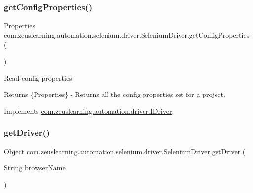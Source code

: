 \hypertarget{classcom_1_1zeuslearning_1_1automation_1_1selenium_1_1driver_1_1SeleniumDriver_afc8bad9a9bea7df6280ba685e52db540}{}\label{classcom_1_1zeuslearning_1_1automation_1_1selenium_1_1driver_1_1SeleniumDriver_afc8bad9a9bea7df6280ba685e52db540} 
\subsubsection{\texorpdfstring{get\+Config\+Properties()}{getConfigProperties()}}
{\footnotesize\ttfamily Properties com.\+zeuslearning.\+automation.\+selenium.\+driver.\+Selenium\+Driver.\+get\+Config\+Properties (\begin{DoxyParamCaption}{ }\end{DoxyParamCaption})\hspace{0.3cm}{\ttfamily [inline]}}

Read config properties

\begin{DoxyReturn}{Returns}
\{Properties\} -\/ Returns all the config properties set for a project. 
\end{DoxyReturn}


Implements \hyperlink{interfacecom_1_1zeuslearning_1_1automation_1_1driver_1_1IDriver_a2530732df342f07743bed12deb55fee8}{com.\+zeuslearning.\+automation.\+driver.\+I\+Driver}.

\hypertarget{classcom_1_1zeuslearning_1_1automation_1_1selenium_1_1driver_1_1SeleniumDriver_a42a9e6ef86ef492717b3fed95e9f353f}{}\label{classcom_1_1zeuslearning_1_1automation_1_1selenium_1_1driver_1_1SeleniumDriver_a42a9e6ef86ef492717b3fed95e9f353f} 
\subsubsection{\texorpdfstring{get\+Driver()}{getDriver()}}
{\footnotesize\ttfamily Object com.\+zeuslearning.\+automation.\+selenium.\+driver.\+Selenium\+Driver.\+get\+Driver (\begin{DoxyParamCaption}\item[{String}]{browser\+Name }\end{DoxyParamCaption})\hspace{0.3cm}{\ttfamily [inline]}}

